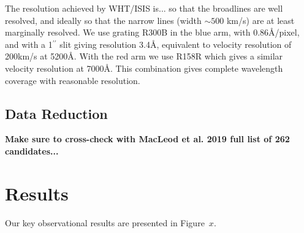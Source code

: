\documentclass[a4paper,fleqn,usenatbib]{mnras}
\begin{document}
The resolution achieved by WHT/ISIS is... 
 so that the broadlines are well
resolved, and ideally so that the narrow lines (width $\sim 500$ km/s)
are at least marginally resolved. We use grating R300B in the blue
arm, with 0.86\AA /pixel, and with a 1$^{\prime\prime}$ slit giving
resolution 3.4\AA , equivalent to velocity resolution of 200km/s at
5200\AA . With the red arm we use R158R which gives a similar velocity
resolution at 7000\AA.  This combination gives complete wavelength
coverage with reasonable resolution. 


\subsection{Data Reduction}

{\bf Make sure to cross-check with MacLeod et al. 2019 
full list of 262 candidates...}




\section{Results}\label{sec:results} 
Our key observational results are presented in Figure~$x$. 
\end{document}
